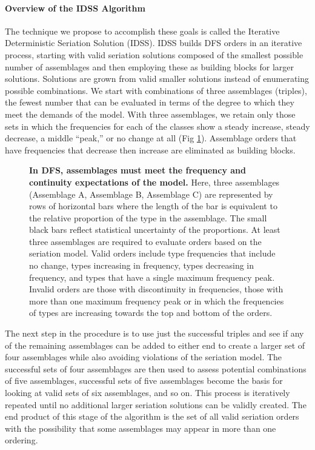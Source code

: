 \documentclass[10pt,letterpaper]{article}
\begin{document}
\paragraph{Overview of the IDSS Algorithm}
The technique we propose to accomplish these goals is called the Iterative Deterministic Seriation Solution (IDSS). IDSS builds DFS orders in an iterative process, starting with valid seriation solutions composed of the smallest possible number of assemblages and then employing these as building blocks for larger solutions. Solutions are grown from valid smaller solutions instead of enumerating possible combinations. We start with combinations of three assemblages (triples), the fewest number that can be evaluated in terms of the degree to which they meet the demands of the model. With three assemblages, we retain only those sets in which the frequencies for each of the classes show a steady increase, steady decrease, a middle ``peak,'' or no change at all (Fig \ref{fig4}). Assemblage orders that have frequencies that decrease then increase are eliminated as building blocks. 

\begin{figure}[h]
\caption{{\bf In DFS, assemblages must meet the frequency and continuity expectations of the model.} Here, three assemblages (Assemblage A, Assemblage B, Assemblage C) are represented by rows of horizontal bars where the length of the bar is equivalent to the relative proportion of the type in the assemblage. The small black bars reflect statistical uncertainty of the proportions. At least three assemblages are required to evaluate orders based on the seriation model. Valid orders include type frequencies that include no change, types increasing in frequency, types decreasing in frequency, and types that have a single maximum frequency peak. Invalid orders are those with discontinuity in frequencies, those with more than one maximum frequency peak or in which the frequencies of types are increasing towards the top and bottom of the orders. }
\label{fig4}
\end{figure}

The next step in the procedure is to use just the successful triples and see if any of the remaining assemblages can be added to either end to create a larger set of four assemblages while also avoiding violations of the seriation model. The successful sets of four assemblages are then used to assess potential combinations of five assemblages,  successful sets of five assemblages become the basis for looking at valid sets of six assemblages, and so on. This process is iteratively repeated until no additional larger seriation solutions can be validly created. The end product of this stage of the algorithm is the set of all valid seriation orders with the possibility that some assemblages may appear in more than one ordering. 
\end{document}
